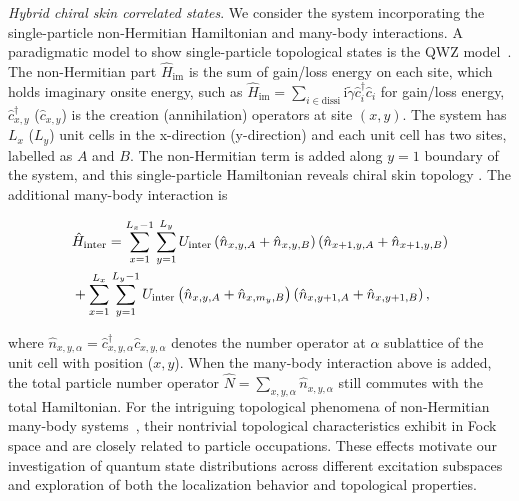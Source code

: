 \documentclass[longbibliography, aps, prx, amsmath, amssymb, amsfonts, twocolumn,superscriptaddress, footinbib]{revtex4-1}
\begin{document}
	\textit{Hybrid chiral skin correlated states}. We consider the system incorporating the single-particle non-Hermitian Hamiltonian and many-body interactions. 
	A paradigmatic model to show single-particle topological states is the QWZ model~\cite{qi2006topological}. The non-Hermitian part $\hat{H}_{\text{im}}$ is the sum of gain/loss energy on each site, which holds imaginary onsite energy, such as $\hat{H}_{\text{im}} = \sum_{i\in \text{dissi}} \mathrm{i}\tilde{\gamma} \hat{c}_i^{\dagger} \hat{c}_i$ for gain/loss energy, $\hat{c}_{{x}, {y}}^{\dagger}$ ($\hat{c}_{{x}, {y}}$) is the creation (annihilation) operators at site $({x},{y})$.  The system has $L_x$ ($L_y$) unit cells in the x-direction (y-direction) and each unit cell has two sites, labelled as $A$ and $B$. The non-Hermitian term is added along $y=1$ boundary of the system, and this single-particle Hamiltonian reveals chiral skin topology \cite{nakamura2023universal, ma2024non, schindler2023hermitian}.
    The additional many-body interaction is
        \begin{small}
		\begin{align}
			&\hat{H}_{\text{inter}}  = \sum_{{x}=1}^{L_{x}-1} \sum_{{y}=1}^{L_{y}}  U_{\text{inter}} \left(\hat{n}_{{x}, {y}, A}+\hat{n}_{{x}, {y}, B}\right) \left(\hat{n}_{{x}+1, {y}, A}+\hat{n}_{{x}+1, {y}, B}\right)\notag\\
			& + 
			\sum_{{x}=1}^{L_{x}} \sum_{{y}=1}^{L_{y}-1}  U_{\text{inter}} \left(\hat{n}_{{x}, {y}, A}+\hat{n}_{{x}, m_y, B}\right) \left(\hat{n}_{{x}, {y}+1, A}+\hat{n}_{{x}, {y}+1, B}\right), \label{eq:inter_cell}
		\end{align}
        \end{small}
	where $\hat{n}_{{x},{y},\alpha}=\hat{c}_{x,y,\alpha}^{\dagger}\hat{c}_{x,y,\alpha}$ denotes the number operator at $\alpha$ sublattice of the unit cell with position (${x},{y}$). When the many-body interaction above is added, the
	total particle number operator $\hat{N} = \sum_{x,y,\alpha} \hat{n}_{x,y,\alpha}$ still commutes with the total Hamiltonian.
    For the intriguing topological phenomena of non-Hermitian many-body systems~\cite{shen2024enhanced,shimomura2024general,deng2022observing}, their nontrivial topological characteristics exhibit in Fock space and are closely related to particle occupations. These effects motivate our investigation of quantum state distributions across different excitation subspaces and exploration of both the localization behavior and topological properties.
\end{document}
